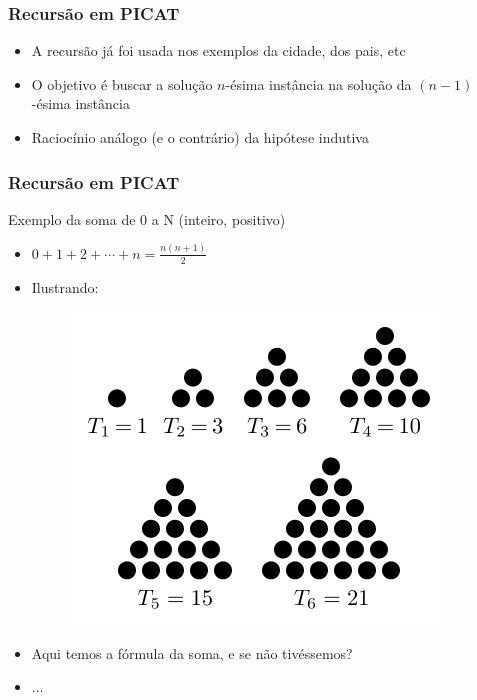 \documentclass[10pt]{beamer}
\begin{document}
\begin{frame}%
 \frametitle{Recursão em PICAT}

\begin{block}{}

\begin{itemize}
  \item A recursão já foi usada nos exemplos da cidade, dos pais, etc
  \pause
  
  \item O objetivo é buscar a solução $n$-ésima instância na solução da $(n-1)$-ésima   instância
  \pause
  
  \item Raciocínio análogo (e o contrário) da hipótese indutiva
  
  
\end{itemize}

\end{block}

\end{frame}

\begin{frame}%
 \frametitle{Recursão em PICAT}

\begin{block}{Exemplo da soma de 0 a N (inteiro, positivo)}
\begin{itemize}
  
  \item $0 + 1 + 2 + \cdots + n = \frac{n(n + 1)}{2}$
  \pause
  
  \item Ilustrando:
  
   \pause
  
  \begin{figure}[!ht]
\centering
\includegraphics[width=.3\textwidth]{figures/six_triangular_numbers.png}
\end{figure}
  
  \item Aqui temos a fórmula da soma, e se não tivéssemos?
  \pause
   
  \item  ...
  
  
  
\end{itemize}



\end{block}

\end{frame}
\end{document}
